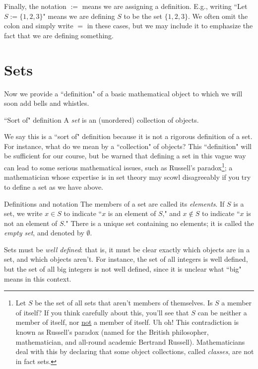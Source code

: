 Finally, the notation $:=$ means we are assigning a definition. E.g., writing ``Let $S:=\{1,2,3\}$" means we are defining $S$ to be the set $\{1,2,3\}$.  We often omit the colon and simply write $=$ in these cases, but we may include it to emphasize the fact that we are defining something.

\section{Sets}
Now we provide a ``definition" of a basic mathematical object to which we will soon add bells and whistles.

\begin{df}{``Sort of" definition} A \textit{set} is an (unordered)
collection of objects.\end{df}

We say this is a ``sort of" definition because it is not a
rigorous definition of a set.  For instance, what do we mean by a
``collection" of objects? This ``definition" will be sufficient for
our course, but be warned that defining a set in this vague way can
lead to some serious mathematical issues, such as Russell's
paradox\footnote{ Let $S$ be the set of all sets that aren't members
of themselves.  Is $S$ a member of itself? If you think carefully
about this, you'll see that $S$ can be neither a member of itself,
nor \underline{not} a member of itself. Uh oh!  This contradiction
is known as Russell's paradox (named for the British philosopher, mathematician, and all-round academic Bertrand Russell). Mathematicians deal with this by
declaring that some object collections, called \textit{classes}, are
not in fact sets.};  a mathematician whose expertise is in set
theory may scowl disagreeably if you try to define a set as we have
above.

\begin{df}{Definitions and notation} The members of a set are called its \textit{elements}. If
$S$ is a set, we write $x\in S$ to indicate ``$x$ is an element
of $S$," and $x \not\in S$ to indicate ``$x$ is not an element
of $S$."  There is a unique set containing no elements; it is
called the \textit{empty set}, and denoted by $\emptyset$.\end{df}


Sets must be \textit{well defined}: that is, it must be clear
exactly which objects are in a set, and which objects aren't.
For instance, the set of all integers is well defined, but the
set of all big integers is not well defined, since it is
unclear what ``big" means in this context.


